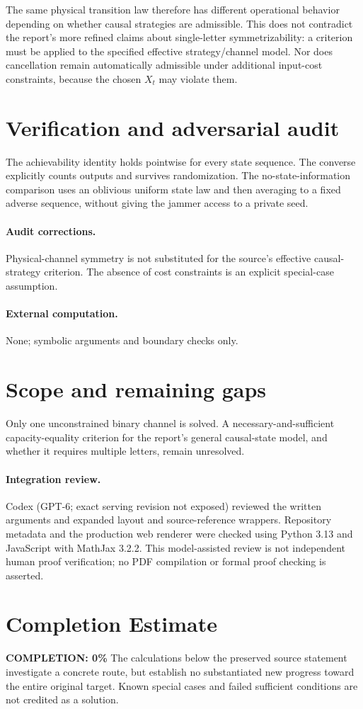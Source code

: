 \documentclass[11pt]{article}
\begin{document}
The same physical transition law therefore has different operational behavior depending on whether causal strategies are admissible. This does not contradict the report's more refined claims about single-letter symmetrizability: a criterion must be applied to the specified effective strategy/channel model. Nor does cancellation remain automatically admissible under additional input-cost constraints, because the chosen $X_t$ may violate them.
\section{Verification and adversarial audit}
The achievability identity holds pointwise for every state sequence. The converse explicitly counts outputs and survives randomization. The no-state-information comparison uses an oblivious uniform state law and then averaging to a fixed adverse sequence, without giving the jammer access to a private seed.
\paragraph{Audit corrections.} Physical-channel symmetry is not substituted for the source's effective causal-strategy criterion. The absence of cost constraints is an explicit special-case assumption.
\paragraph{External computation.} None; symbolic arguments and boundary checks only.
\section{Scope and remaining gaps}
Only one unconstrained binary channel is solved. A necessary-and-sufficient capacity-equality criterion for the report's general causal-state model, and whether it requires multiple letters, remain unresolved.
\paragraph{Integration review.} Codex (GPT-6; exact serving revision not exposed) reviewed the written arguments and expanded layout and source-reference wrappers. Repository metadata and the production web renderer were checked using Python 3.13 and JavaScript with MathJax 3.2.2. This model-assisted review is not independent human proof verification; no PDF compilation or formal proof checking is asserted.

\section{Completion Estimate}
\noindent\textbf{COMPLETION: 0\%}
The calculations below the preserved source statement investigate a concrete route,
but establish no substantiated new progress toward the entire original target.
Known special cases and failed sufficient conditions are not credited as a solution.
\end{document}
